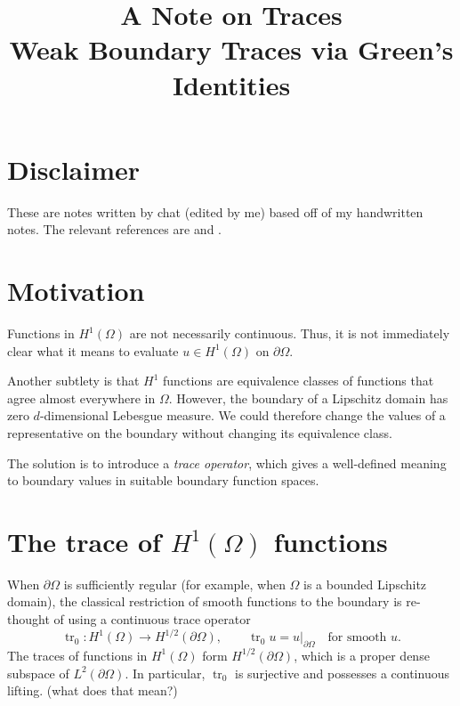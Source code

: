 \documentclass[11pt,a4paper]{article}
\title{\textbf{A Note on Traces\\\large Weak Boundary Traces via Green's Identities}}
\author{}
\date{}
\newcommand{\Om}{\Omega}
\newcommand{\tr}{\operatorname{tr}}
\begin{document}
\maketitle
\vspace{-1.5em}

\section{Disclaimer}
These are notes written by chat (edited by me) based off of my handwritten notes. The relevant references are \cite{BoffiTrace} and \cite{BeeckTrace}.

\section{Motivation}

Functions in $H^1(\Om)$ are not necessarily continuous. Thus, it is not
immediately clear what it means to evaluate $u\in H^1(\Om)$ on $\partial\Om$.

Another subtlety is that $H^1$ functions are equivalence classes of functions
that agree almost everywhere in $\Om$. However, the boundary of a Lipschitz
domain has zero $d$-dimensional Lebesgue measure. We could therefore change
the values of a representative on the boundary without changing its
equivalence class.

The solution is to introduce a \emph{trace operator}, which gives a
well-defined meaning to boundary values in suitable boundary function spaces.

\section{The trace of \texorpdfstring{$H^1(\Om)$}{H1} functions}

When $\partial\Om$ is sufficiently regular (for example, when $\Om$ is a
bounded Lipschitz domain), the classical restriction of smooth functions to
the boundary is re-thought of using a continuous trace operator
\[
    \tr_0:H^1(\Om)\longrightarrow H^{1/2}(\partial\Om),
    \qquad \tr_0 u = u|_{\partial\Om}
    \quad\text{for smooth }u.
\]
The traces of functions in $H^1(\Om)$ form $H^{1/2}(\partial\Om)$, which
is a proper dense subspace of $L^2(\partial\Om)$.
In particular, $\tr_0$ is surjective and possesses a continuous lifting. (what does that mean?)
\end{document}

